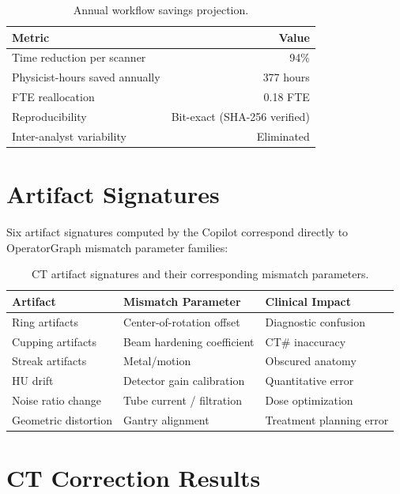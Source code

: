 \documentclass[11pt]{article}
\begin{document}
\begin{table}[htbp]
\centering
\caption{Annual workflow savings projection.}
\begin{tabular}{lr}
\toprule
\textbf{Metric} & \textbf{Value} \\
\midrule
Time reduction per scanner         & 94\% \\
Physicist-hours saved annually     & 377 hours \\
FTE reallocation                   & 0.18 FTE \\
Reproducibility                    & Bit-exact (SHA-256 verified) \\
Inter-analyst variability          & Eliminated \\
\bottomrule
\end{tabular}
\end{table}

\section{Artifact Signatures}

Six artifact signatures computed by the Copilot correspond directly to OperatorGraph mismatch parameter families:

\begin{table}[htbp]
\centering
\caption{CT artifact signatures and their corresponding mismatch parameters.}
\begin{tabular}{lll}
\toprule
\textbf{Artifact} & \textbf{Mismatch Parameter} & \textbf{Clinical Impact} \\
\midrule
Ring artifacts      & Center-of-rotation offset  & Diagnostic confusion \\
Cupping artifacts   & Beam hardening coefficient & CT\# inaccuracy \\
Streak artifacts    & Metal/motion               & Obscured anatomy \\
HU drift            & Detector gain calibration  & Quantitative error \\
Noise ratio change  & Tube current / filtration  & Dose optimization \\
Geometric distortion & Gantry alignment          & Treatment planning error \\
\bottomrule
\end{tabular}
\end{table}

\section{CT Correction Results}
\end{document}
